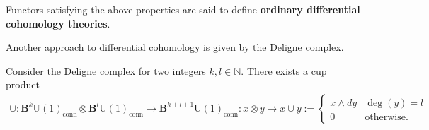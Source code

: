     Functors satisfying the above properties are said to define \textbf{ordinary differential cohomology theories}.

    Another approach to differential cohomology is given by the Deligne complex.

    \begin{property}
        Consider the Deligne complex for two integers $k,l\in\mathbb{N}$. There exists a cup product
        \begin{gather}
            \cup:\mathbf{B}^k\mathrm{U}(1)_\mathrm{conn}\otimes\mathbf{B}^l\mathrm{U}(1)_\mathrm{conn}\rightarrow\mathbf{B}^{k+l+1}\mathrm{U}(1)_\mathrm{conn}:x\otimes y\mapsto x\cup y:=
            \begin{cases}
                x\wedge dy&\deg(y)=l\\
                0&\text{otherwise}.
            \end{cases}
        \end{gather}
    \end{property}


